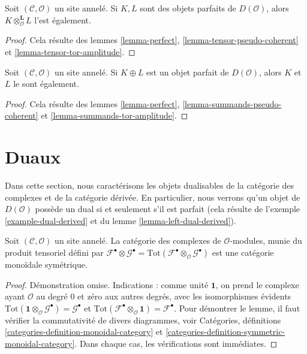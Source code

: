 \begin{lemma}
\label{lemma-tensor-perfect}
Soit $(\mathcal{C}, \mathcal{O})$ un site annelé. Si $K, L$ sont des objets
parfaits de $D(\mathcal{O})$, alors
$K \otimes_\mathcal{O}^\mathbf{L} L$ l'est également.
\end{lemma}

\begin{proof}
Cela résulte des lemmes \ref{lemma-perfect},
\ref{lemma-tensor-pseudo-coherent} et
\ref{lemma-tensor-tor-amplitude}.
\end{proof}

\begin{lemma}
\label{lemma-summands-perfect}
Soit $(\mathcal{C}, \mathcal{O})$ un site annelé. Si $K \oplus L$ est un
objet parfait de $D(\mathcal{O})$, alors $K$ et $L$ le sont également.
\end{lemma}

\begin{proof}
Cela résulte des lemmes \ref{lemma-perfect},
\ref{lemma-summands-pseudo-coherent} et
\ref{lemma-summands-tor-amplitude}.
\end{proof}














\section{Duaux}
\label{section-duals}

\noindent
Dans cette section, nous caractérisons les objets dualisables de la catégorie
des complexes et de la catégorie dérivée. En particulier, nous verrons qu'un
objet de $D(\mathcal{O})$ possède un dual si et seulement s'il est parfait
(cela résulte de l'exemple \ref{example-dual-derived} et du lemme
\ref{lemma-left-dual-derived}).

\begin{lemma}
\label{lemma-symmetric-monoidal-cat-complexes}
Soit $(\mathcal{C}, \mathcal{O})$ un site annelé. La catégorie des complexes
de $\mathcal{O}$-modules, munie du produit tensoriel défini par
$\mathcal{F}^\bullet \otimes \mathcal{G}^\bullet =
\text{Tot}(\mathcal{F}^\bullet \otimes_\mathcal{O} \mathcal{G}^\bullet)$
est une catégorie monoïdale symétrique.
\end{lemma}

\begin{proof}
Démonstration omise. Indications : comme unité $\mathbf{1}$, on prend le
complexe ayant $\mathcal{O}$ au degré $0$ et zéro aux autres degrés, avec les
isomorphismes évidents
$\text{Tot}(\mathbf{1} \otimes_\mathcal{O} \mathcal{G}^\bullet) =
\mathcal{G}^\bullet$ et
$\text{Tot}(\mathcal{F}^\bullet \otimes_\mathcal{O} \mathbf{1}) =
\mathcal{F}^\bullet$. Pour démontrer le lemme, il faut vérifier la
commutativité de divers diagrammes, voir Catégories, définitions
\ref{categories-definition-monoidal-category} et
\ref{categories-definition-symmetric-monoidal-category}.
Dans chaque cas, les vérifications sont immédiates.
\end{proof}

